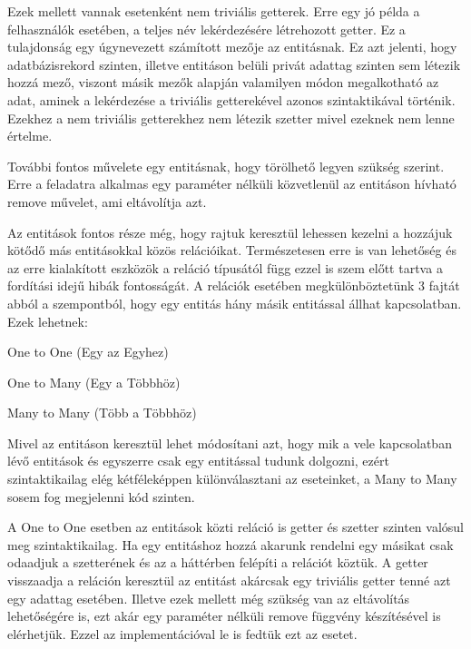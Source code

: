 Ezek mellett vannak esetenként nem triviális getterek. Erre egy jó példa a felhasználók esetében, a teljes név lekérdezésére létrehozott getter. Ez a tulajdonság egy úgynevezett számított mezője az entitásnak. Ez azt jelenti, hogy adatbázisrekord szinten, illetve entitáson belüli privát adattag szinten sem létezik hozzá mező, viszont másik mezők alapján valamilyen módon megalkotható az adat, aminek a lekérdezése a triviális getterekével azonos szintaktikával történik. Ezekhez a nem triviális getterekhez nem létezik szetter mivel ezeknek nem lenne értelme.

További fontos művelete egy entitásnak, hogy törölhető legyen szükség szerint. Erre a feladatra alkalmas egy paraméter nélküli közvetlenül az entitáson hívható remove művelet, ami eltávolítja azt.

Az entitások fontos része még, hogy rajtuk keresztül lehessen kezelni a hozzájuk kötődő más entitásokkal közös relációikat. Természetesen erre is van lehetőség és az erre kialakított eszközök a reláció típusától függ ezzel is szem előtt tartva a fordítási idejű hibák fontosságát. A relációk esetében megkülönböztetünk 3 fajtát abból a szempontból, hogy egy entitás hány másik entitással állhat kapcsolatban. Ezek lehetnek:

\begin{compactitem}
	\item One to One (Egy az Egyhez)
	\item One to Many (Egy a Többhöz)
	\item Many to Many (Több a Többhöz)
\end{compactitem}

Mivel az entitáson keresztül lehet módosítani azt, hogy mik a vele kapcsolatban lévő entitások és egyszerre csak egy entitással tudunk dolgozni, ezért szintaktikailag elég kétféleképpen különválasztani az eseteinket, a Many to Many sosem fog megjelenni kód szinten.

A One to One esetben az entitások közti reláció is getter és szetter szinten valósul meg szintaktikailag. Ha egy entitáshoz hozzá akarunk rendelni egy másikat csak odaadjuk a szetterének és az a háttérben felépíti a relációt köztük. A getter visszaadja a reláción keresztül az entitást akárcsak egy triviális getter tenné azt egy adattag esetében. Illetve ezek mellett még szükség van az eltávolítás lehetőségére is, ezt akár egy paraméter nélküli remove függvény készítésével is elérhetjük. Ezzel az implementációval le is fedtük ezt az esetet.


